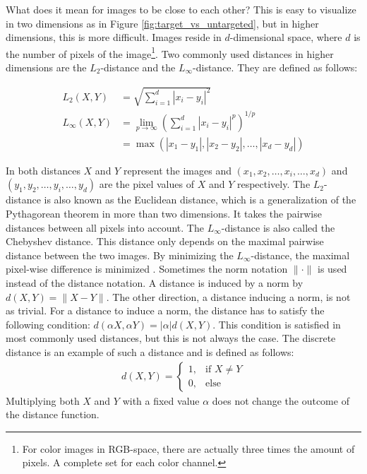 What does it mean for images to be close to each other? This is easy to visualize in two dimensions as in Figure \ref{fig:target_vs_untargeted}, but in higher dimensions, this is more difficult. Images reside in $d$-dimensional space, where $d$ is the number of pixels of the image\footnote{For color images in RGB-space, there are actually three times the amount of pixels. A complete set for each color channel.}. Two commonly used distances in higher dimensions are the $L_2$-distance and the $L_\infty$-distance. They are defined as follows:

\begin{align*}
L_2(X, Y) &= \sqrt{\sum_{i=1}^d|x_i - y_i|^2} \\
L_\infty(X, Y) &= \lim_{p\rightarrow \infty}\left( \sum_{i=1}^d|x_i-y_i|^p\right)^{1/p} \\
&= \max (|x_1 - y_1|, |x_2-y_2|, \ldots, |x_d-y_d|)
\end{align*}

In both distances $X$ and $Y$ represent the images and $(x_1, x_2, \ldots, x_i, \ldots, x_d)$ and $(y_1, y_2, \ldots, y_i, \ldots, y_d)$ are the pixel values of $X$ and $Y$ respectively. The $L_2$-distance is also known as the Euclidean distance, which is a generalization of the Pythagorean theorem in more than two dimensions. It takes the pairwise distances between all pixels into account. The $L_\infty$-distance is also called the Chebyshev distance. This distance only depends on the maximal pairwise distance between the two images. By minimizing the $L_\infty$-distance, the maximal pixel-wise difference is minimized \cite{wiki_distances}.  Sometimes the norm notation $\| \cdot \|$ is used instead of the distance notation. A distance is induced by a norm by $d(X,Y) = \| X -Y\|$. The other direction, a distance inducing a norm, is not as trivial. For a distance to induce a norm, the distance has to satisfy the following condition: $d(\alpha X,\alpha Y) = |\alpha | d(X,Y)$. This condition is satisfied in most commonly used distances, but this is not always the case. The discrete distance \cite{discrete_distance} is an example of such a distance and is defined as follows:
\begin{align*}
d(X,Y) = 
\begin{cases}
1, &\text{if } X \neq Y\\
0, &\text{else}
\end{cases}
\end{align*}
Multiplying both $X$ and $Y$ with a fixed value $\alpha$ does not change the outcome of the distance function.\\

